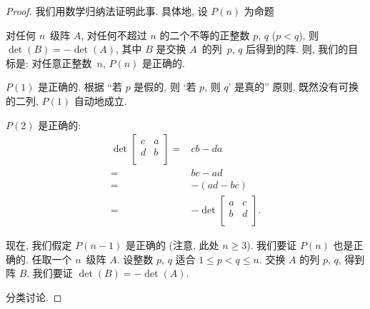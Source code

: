 \documentclass[%
    UTF8,%
    fontset=none,%
    punct=kaiming,%
    zihao=-4,%
    a4paper,%
    oneside,%
]{ctexbook}
\makeatletter
\renewcommand*{\leq}{\leqslant}
\renewcommand*{\geq}{\geqslant}
\renewenvironment{quotation}
{\list{}{\listparindent 2\ccwd%
\itemindent\listparindent
\leftmargin\rightmargin
\parsep\z@ \@plus\p@}%
\item\relax}
{\endlist}
\makeatother
\begin{document}
\begin{proof}
    我们用数学归纳法证明此事.
    具体地, 设 \(P(n)\) 为命题
    \begin{quotation}
        对任何 \(n\)~级阵 \(A\),
        对任何不超过 \(n\) 的二个不等的正整数 \(p\), \(q\)
        (\(p < q\)),
        则 \(\det {(B)} = -\det {(A)}\),
        其中 \(B\) 是交换 \(A\)~的列~\(p\), \(q\) 后得到的阵.
    \end{quotation}
    则, 我们的目标是:
    对任意正整数~\(n\), \(P(n)\) 是正确的.

    \(P(1)\) 是正确的.
    根据
    ``若 \(p\) 是假的, 则 `若 \(p\), 则 \(q\)' 是真的''
    原则,
    既然没有可换的二列,
    \(P(1)\) 自动地成立.

    \(P(2)\) 是正确的:
    \begin{align*}
        \det {
            \begin{bmatrix}
                c & a \\
                d & b \\
            \end{bmatrix}
        }
        = {} & cb - da      \\
        = {} & bc - ad      \\
        = {} & {-(ad - bc)} \\
        = {} &
        {-\det {
                    \begin{bmatrix}
                        a & c \\
                        b & d \\
                    \end{bmatrix}
                }}.
    \end{align*}

    现在, 我们假定 \(P(n-1)\) 是正确的
    (注意, 此处 \(n \geq 3\)).
    我们要证 \(P(n)\) 也是正确的.
    任取一个 \(n\)~级阵 \(A\).
    设整数 \(p\), \(q\) 适合
    \(1 \leq p < q \leq n\).
    交换 \(A\) 的列 \(p\), \(q\),
    得到阵 \(B\).
    我们要证 \(\det {(B)} = -\det {(A)}\).

    分类讨论.


\end{proof}
\end{document}
